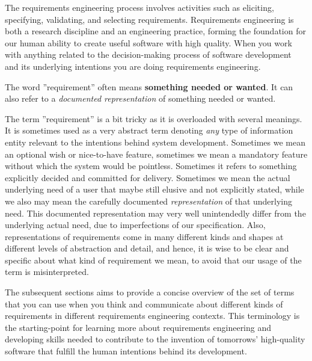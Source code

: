 \documentclass[a4paper,10pt,oneside]{book}
\begin{document}
%
%
The requirements engineering process involves activities such as eliciting, specifying, validating, and selecting requirements. 
Requirements engineering is both a research discipline and an engineering practice, forming the foundation for our human ability to create useful software with high quality. When you work with anything related to the decision-making process of software development and its underlying intentions you are doing requirements engineering.



The word ''requirement'' often means \textbf{something needed or wanted}. It can also refer to a \emph{documented representation} of something needed or wanted. 

The term ''requirement'' is a bit tricky as it is overloaded with several meanings. It is sometimes used as a very abstract term denoting \textit{any} type of information entity relevant to the intentions behind system development.  Sometimes we mean an optional wish or nice-to-have feature, sometimes we mean a mandatory feature without which the system would be pointless. Sometimes it refers to something explicitly decided and committed for delivery. Sometimes we mean the actual underlying need of a user that maybe still elusive and not explicitly stated, while we also may mean the carefully documented \textit{representation} of that underlying need. This documented representation may very well unintendedly differ from the underlying actual need, due to imperfections of our specification. 
Also, representations of requirements come in many different kinds and shapes at different levels of abstraction and detail, and hence, it is wise to be clear and specific about what kind of requirement we mean, to avoid that our usage of the term is misinterpreted. 


The subsequent sections aims to provide a concise overview of the set of terms that you can use when you think and communicate about different kinds of requirements in different requirements engineering contexts. This terminology is the starting-point for learning more about requirements engineering and developing skills needed to contribute to the invention of tomorrows' high-quality software that fulfill the human intentions behind its development.
\end{document}
